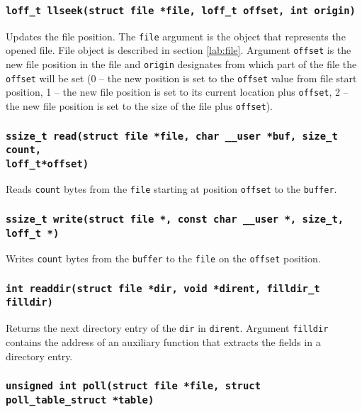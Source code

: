 \subsubsection{\texttt{loff\_t llseek(struct file *file, loff\_t offset, int origin)}}

Updates the file position. The \texttt{file} argument is the object that represents the opened
file. File object is described in section \ref{lab:file}. Argument \texttt{offset} is
the new file position in the file and \texttt{origin} designates from which part of the file
the \texttt{offset} will be set (0 -- the new position is set to the \texttt{offset} value
from file start position, 1 -- the new file position is set to its current location
plus \texttt{offset}, 2 -- the new file position is set to the size of the file plus
\texttt{offset}). 

\subsubsection{\texttt{ssize\_t read(struct file *file, char \_\_user *buf, size\_t
count,\\loff\_t*offset)}}

Reads \texttt{count} bytes from the \texttt{file} starting at position \texttt{offset} to
the \texttt{buffer}.

\subsubsection{\texttt{ssize\_t write(struct file *, const char \_\_user *, size\_t,
loff\_t *)}}

Writes \texttt{count} bytes from the \texttt{buffer} to the \texttt{file} on the
\texttt{offset} position.

\subsubsection{\texttt{int readdir(struct file *dir, void *dirent, filldir\_t filldir)}}

Returns the next directory entry of the \texttt{dir} in \texttt{dirent}. Argument
\texttt{filldir} contains the address of an auxiliary function that extracts the
fields in a directory entry.

\subsubsection{\texttt{unsigned int poll(struct file *file, struct poll\_table\_struct
*table)}}

